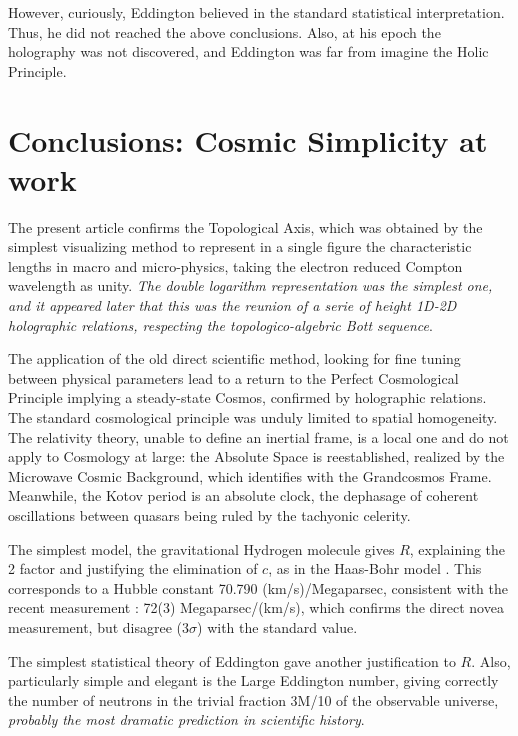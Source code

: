 \documentclass[twoside,draft]{article}
\begin{document}
\begin{sloppypar}
However, curiously, Eddington believed in the standard statistical interpretation. Thus, he did not reached the above conclusions. Also, at his epoch the holography was not discovered, and Eddington was far from imagine the Holic Principle. 



\section {Conclusions: Cosmic Simplicity at work}

The present article confirms the Topological Axis, which was obtained by the simplest visualizing method to represent in a single figure the characteristic lengths in macro and micro-physics, taking the electron reduced Compton wavelength as unity. \textit {The double logarithm representation was the simplest one, and it appeared later that this was the reunion of a serie of height 1D-2D holographic relations, respecting the topologico-algebric Bott sequence}.

The application of the old direct scientific method, looking for fine tuning between physical parameters lead to a return to the Perfect Cosmological Principle implying a steady-state Cosmos, confirmed by holographic relations. The standard cosmological principle was unduly limited to spatial homogeneity. The relativity theory, unable to define an inertial frame, is a local one and do not apply to Cosmology at large: the Absolute Space is reestablished, realized by the Microwave Cosmic Background, which identifies with the Grandcosmos Frame. Meanwhile, the Kotov period is an absolute clock, the dephasage of coherent oscillations between quasars being ruled by the tachyonic celerity.

The simplest model, the gravitational Hydrogen molecule gives $R$, explaining the 2 factor and
justifying the elimination of $c$, as in the Haas-Bohr model \cite{Sanchez1}. This corresponds to a Hubble constant 70.790
(km/s)/Megaparsec, consistent with the recent measurement \cite{Bonvin}: 72(3) Megaparsec/(km/s), which
confirms the direct novea measurement, but disagree (3$\sigma$) with the standard value.

The simplest statistical theory of Eddington gave another justification to $R$. Also, particularly
simple and elegant is the Large Eddington number, giving correctly the number of neutrons in the
trivial fraction 3M/10 of the observable universe, \textit{probably the most dramatic prediction in
 scientific history}.


\end{sloppypar}
\end{document}
